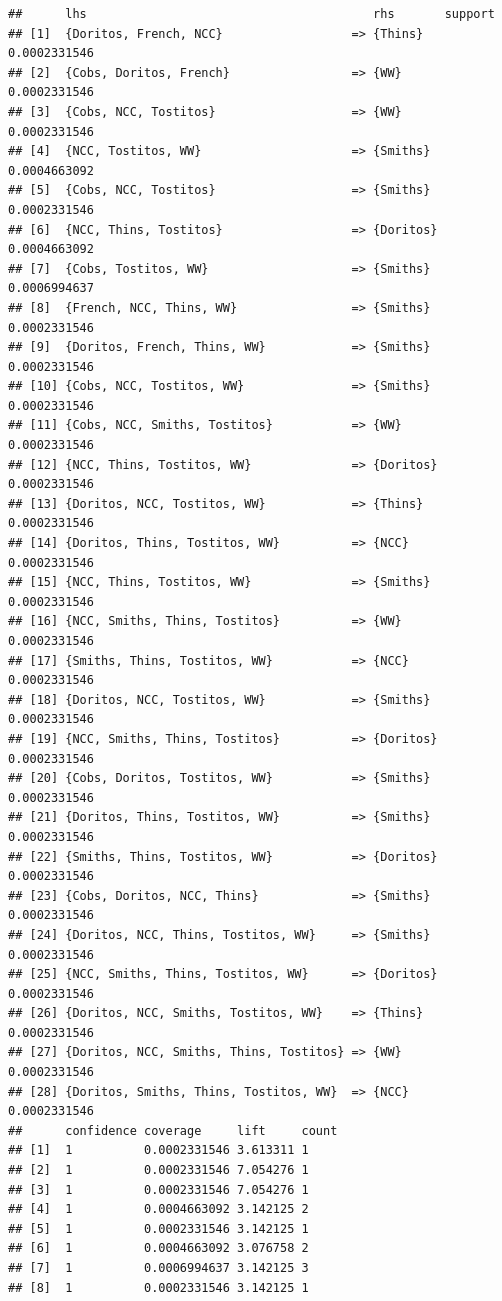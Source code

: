 \documentclass[
]{article}
\begin{document}
\begin{verbatim}
##      lhs                                        rhs       support     
## [1]  {Doritos, French, NCC}                  => {Thins}   0.0002331546
## [2]  {Cobs, Doritos, French}                 => {WW}      0.0002331546
## [3]  {Cobs, NCC, Tostitos}                   => {WW}      0.0002331546
## [4]  {NCC, Tostitos, WW}                     => {Smiths}  0.0004663092
## [5]  {Cobs, NCC, Tostitos}                   => {Smiths}  0.0002331546
## [6]  {NCC, Thins, Tostitos}                  => {Doritos} 0.0004663092
## [7]  {Cobs, Tostitos, WW}                    => {Smiths}  0.0006994637
## [8]  {French, NCC, Thins, WW}                => {Smiths}  0.0002331546
## [9]  {Doritos, French, Thins, WW}            => {Smiths}  0.0002331546
## [10] {Cobs, NCC, Tostitos, WW}               => {Smiths}  0.0002331546
## [11] {Cobs, NCC, Smiths, Tostitos}           => {WW}      0.0002331546
## [12] {NCC, Thins, Tostitos, WW}              => {Doritos} 0.0002331546
## [13] {Doritos, NCC, Tostitos, WW}            => {Thins}   0.0002331546
## [14] {Doritos, Thins, Tostitos, WW}          => {NCC}     0.0002331546
## [15] {NCC, Thins, Tostitos, WW}              => {Smiths}  0.0002331546
## [16] {NCC, Smiths, Thins, Tostitos}          => {WW}      0.0002331546
## [17] {Smiths, Thins, Tostitos, WW}           => {NCC}     0.0002331546
## [18] {Doritos, NCC, Tostitos, WW}            => {Smiths}  0.0002331546
## [19] {NCC, Smiths, Thins, Tostitos}          => {Doritos} 0.0002331546
## [20] {Cobs, Doritos, Tostitos, WW}           => {Smiths}  0.0002331546
## [21] {Doritos, Thins, Tostitos, WW}          => {Smiths}  0.0002331546
## [22] {Smiths, Thins, Tostitos, WW}           => {Doritos} 0.0002331546
## [23] {Cobs, Doritos, NCC, Thins}             => {Smiths}  0.0002331546
## [24] {Doritos, NCC, Thins, Tostitos, WW}     => {Smiths}  0.0002331546
## [25] {NCC, Smiths, Thins, Tostitos, WW}      => {Doritos} 0.0002331546
## [26] {Doritos, NCC, Smiths, Tostitos, WW}    => {Thins}   0.0002331546
## [27] {Doritos, NCC, Smiths, Thins, Tostitos} => {WW}      0.0002331546
## [28] {Doritos, Smiths, Thins, Tostitos, WW}  => {NCC}     0.0002331546
##      confidence coverage     lift     count
## [1]  1          0.0002331546 3.613311 1    
## [2]  1          0.0002331546 7.054276 1    
## [3]  1          0.0002331546 7.054276 1    
## [4]  1          0.0004663092 3.142125 2    
## [5]  1          0.0002331546 3.142125 1    
## [6]  1          0.0004663092 3.076758 2    
## [7]  1          0.0006994637 3.142125 3    
## [8]  1          0.0002331546 3.142125 1    

\end{verbatim}
\end{document}
